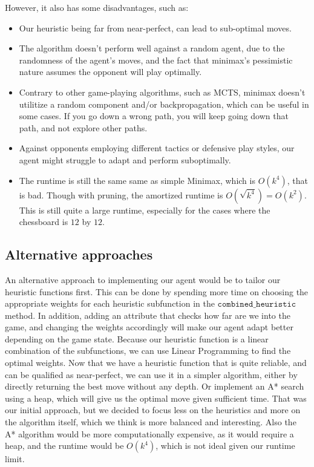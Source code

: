 \documentclass[11pt]{article}
\begin{document}
However, it also has some disadvantages, such as:

\begin{itemize}
    \item Our heuristic being far from near-perfect, can lead to sub-optimal moves.
    \item The algorithm doesn't perform well against a random agent, due to the randomness of the agent's moves, and the fact that minimax's pessimistic nature assumes the opponent will play optimally.
    \item Contrary to other game-playing algorithms, such as MCTS, minimax doesn't utilitize a random component and/or backpropagation, which can be useful in some cases. If you go down a wrong path, you will keep going down that path, and not explore other paths.
    \item Against opponents employing different tactics or defensive play styles, our agent might struggle to adapt and perform suboptimally.
    \item The runtime is still the same same as simple Minimax, which is $O(k^4)$, that is bad. Though with pruning, the amortized runtime is $O(\sqrt{k^4}) =  O(k^2)$. This is still quite a large runtime, especially for the cases where the chessboard is $12$ by $12$.
\end{itemize}

\subsection{Alternative approaches}

An alternative approach to implementing our agent would be to tailor our heuristic functions first. This can be done by spending more time on choosing the appropriate weights for each heuristic 
subfunction in the $\texttt{combined\_heuristic}$ method. In addition, adding an attribute that checks how far are we into the game, and changing the weights accordingly
will make our agent adapt better depending on the game state. Because our heuristic function is a linear combination of the subfunctions, we can use Linear Programming to find the optimal weights.
Now that we have a heuristic function that is quite reliable, and can be qualified as near-perfect, we can use it in a simpler algorithm, either by directly returning the best move without any depth.
Or implement an A* search using a heap, which will give us the optimal move given sufficient time. That was our initial approach, but we decided to focus less on the heuristics and more on the algorithm itself, which
we think is more balanced and interesting. Also the A* algorithm would be more computationally expensive, as it would require a heap, and the runtime would be $O(k^4)$, which is not ideal given our runtime limit.
\end{document}
